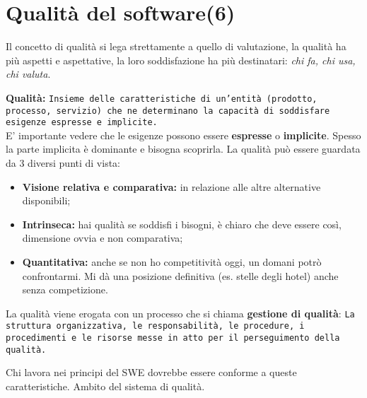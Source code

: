 



\section{Qualità del software(6)}
Il concetto di qualità si lega strettamente a quello di valutazione, la qualità ha più aspetti e aspettative, la loro soddisfazione ha più destinatari: \textit{chi fa, chi usa, chi valuta}.

\textbf{Qualità:} \texttt{Insieme delle caratteristiche di un'entità (prodotto, processo, servizio) che ne determinano la capacità di soddisfare esigenze espresse e implicite.}\\
E' importante vedere che le esigenze possono essere \textbf{espresse} o \textbf{implicite}. Spesso la parte implicita è dominante e bisogna scoprirla. La qualità può essere guardata da 3 diversi punti di vista:

\begin{itemize}

	\item \textbf{Visione relativa e comparativa:} in relazione alle altre alternative disponibili;
	\item \textbf{Intrinseca:} hai qualità se soddisfi i bisogni, è chiaro che deve essere così, dimensione ovvia e non comparativa;
	\item \textbf{Quantitativa:} anche se non ho competitività oggi, un domani potrò confrontarmi. Mi dà una posizione definitiva (es. stelle degli hotel) anche senza competizione.

\end{itemize} 

La qualità viene erogata con un processo che si chiama \textbf{gestione di qualità}: \texttt{La struttura organizzativa, le responsabilità, le procedure, i procedimenti e le risorse messe in atto per il perseguimento della qualità.}

Chi lavora nei principi del SWE dovrebbe essere conforme a queste caratteristiche. Ambito del sistema di qualità.

